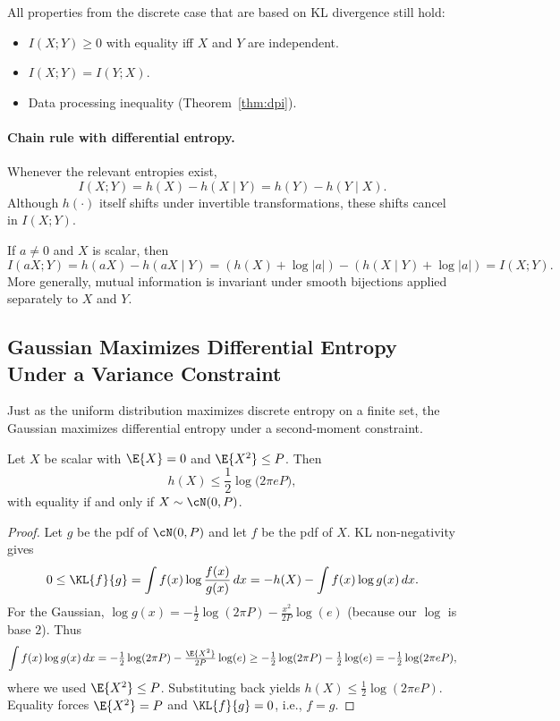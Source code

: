 All properties from the discrete case that are based on KL divergence still hold:
\begin{itemize}[leftmargin=2em]
    \item $I(X;Y)\ge 0$ with equality iff $X$ and $Y$ are independent.
    \item $I(X;Y)=I(Y;X)$.
    \item Data processing inequality (Theorem~\ref{thm:dpi}).
\end{itemize}

\paragraph{Chain rule with differential entropy.}
Whenever the relevant entropies exist,
\begin{equation}
    I(X;Y)=h(X)-h(X\mid Y)=h(Y)-h(Y\mid X).
\end{equation}
Although $h(\cdot)$ itself shifts under invertible transformations, these shifts cancel in $I(X;Y)$.

\begin{remark}
If $a\neq 0$ and $X$ is scalar, then
\[
I(aX;Y)=h(aX)-h(aX\mid Y)=(h(X)+\log|a|)-(h(X\mid Y)+\log|a|)=I(X;Y).
\]
More generally, mutual information is invariant under smooth bijections applied separately to $X$ and $Y$.
\end{remark}

\subsection{Gaussian Maximizes Differential Entropy Under a Variance Constraint}
\label{sec:diffent-gauss-max}

Just as the uniform distribution maximizes discrete entropy on a finite set, the Gaussian maximizes differential entropy under a second-moment constraint.

\begin{theorem}
\label{thm:gauss-maxent}
Let $X$ be scalar with $\E{X}=0$ and $\E{X^2}\le P$.
Then
\begin{equation}
    h(X) \le \frac12\log\bigl(2\pi e P\bigr),
\end{equation}
with equality if and only if $X\sim\cN(0,P)$.
\end{theorem}

\begin{proof}
Let $g$ be the pdf of $\cN(0,P)$ and let $f$ be the pdf of $X$.
KL non-negativity gives
\[
0\le \KL{f}{g} = \int f(x)\log\frac{f(x)}{g(x)}\,dx = -h(X) - \int f(x)\log g(x)\,dx.
\]
For the Gaussian,
\(\log g(x) = -\tfrac12\log(2\pi P) - \tfrac{x^2}{2P}\log(e)\)
(because our $\log$ is base $2$).
Thus
\[
\int f(x)\log g(x)\,dx
= -\tfrac12\log(2\pi P) - \tfrac{\E{X^2}}{2P}\log(e)
\ge -\tfrac12\log(2\pi P) - \tfrac12\log(e)
= -\tfrac12\log(2\pi e P),
\]
where we used $\E{X^2}\le P$.
Substituting back yields $h(X)\le \tfrac12\log(2\pi e P)$.
Equality forces $\E{X^2}=P$ and $\KL{f}{g}=0$, i.e., $f=g$.
\end{proof}
